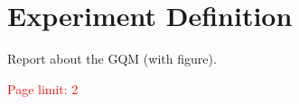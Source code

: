 \section{Experiment Definition}
Report about the GQM (with figure).

\textcolor{red}{Page limit: 2}


